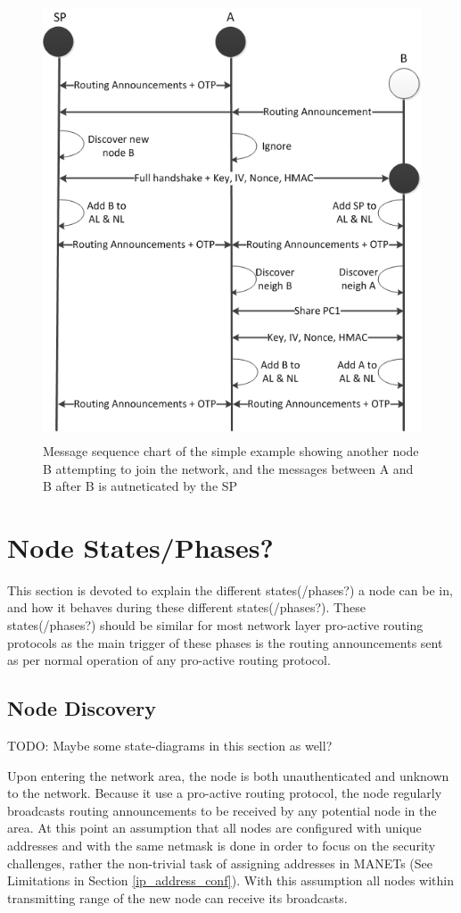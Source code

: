 \begin{figure}[h]
	\centering
  	\includegraphics[height=13cm]{images/simple_example_msc_2.png}
  	\caption{Message sequence chart of the simple example showing another node B
  	  attempting to join the network, and the messages between A and B after B
  	  is autneticated by the SP}
	\label{fig:simple_example_msc_2}
\end{figure}


\section{Node States/Phases?}
This section is devoted to explain the different states(/phases?) a node can be
in, and how it behaves during these different states(/phases?). These
states(/phases?) should be similar for most network layer pro-active routing
protocols as the main trigger of these phases is the routing announcements sent
as per normal operation of any pro-active routing protocol.

\subsection{Node Discovery}
TODO: Maybe some state-diagrams in this section as well?

Upon entering the network area, the node is both unauthenticated and unknown to
the network. Because it use a pro-active routing protocol, the node regularly
broadcasts routing announcements to be received by any potential node in the
area. At this point an assumption that all nodes are configured with unique
addresses and with the same netmask is done in order to focus on the security
challenges, rather the non-trivial task of assigning addresses in \acp{MANET}
(See Limitations in Section \ref{ip_address_conf}). With this assumption all
nodes within transmitting range of the new node can receive its broadcasts.

